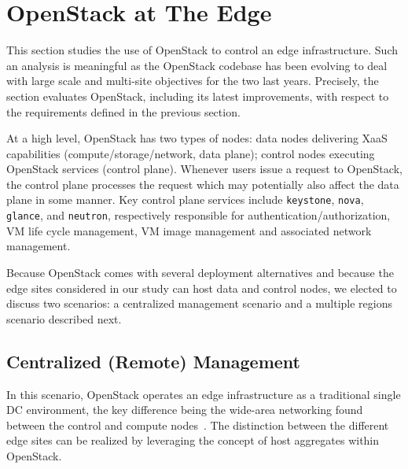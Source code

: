 \section{OpenStack at The Edge}
\label{sec:system_design_considerations}
%
This section studies the use of OpenStack to control an edge
infrastructure. Such an analysis is meaningful as the OpenStack
codebase has been evolving to deal with large scale and multi-site
objectives for the two last years. Precisely, the section evaluates
OpenStack, including its latest improvements, with respect to the requirements
defined in the previous section.


At a high level, OpenStack has two types of nodes: data nodes
delivering XaaS capabilities (compute/storage/network, \ie data
plane); control nodes executing OpenStack services (\ie control
plane). Whenever users issue a request to OpenStack, the control
plane processes the request which may potentially also affect the data plane in some manner. 
Key control plane services include \verb|keystone|,
\verb|nova|, \verb|glance|, and \verb|neutron|, respectively responsible for 
authentication/authorization, VM life cycle management, VM image management and
associated network management.

Because OpenStack comes with several deployment alternatives and
because the edge sites considered in our study can host data and
control nodes, we elected to discuss two scenarios:
a centralized management scenario and a multiple regions scenario described next.

\subsection{Centralized (Remote) Management}
\label{subsec:centralized_os}
In this scenario, OpenStack operates an edge infrastructure
as a traditional single DC environment, %
the key difference being the wide-area networking found between the
control and compute nodes~\cite{www:openstack-wanwide}. The
distinction between the different edge sites can be realized by leveraging the
concept of host aggregates within OpenStack.

